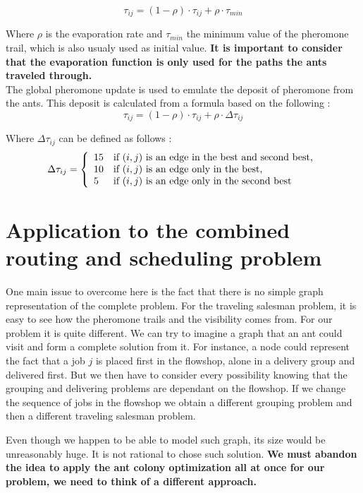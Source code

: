 \documentclass[UTF8, twoside]{EPURapport}
\begin{document}
\[
\tau_{ij} = (1-\rho) \cdot \tau_{ij}+\rho \cdot \tau_{min}
\]

	Where $\rho$ is the evaporation rate and $\tau_{min}$ the minimum value of the pheromone trail, which is also usualy used as initial value. \textbf{It is important to consider that the evaporation function is only used for the paths the ants traveled through.}
\\

	The global pheromone update is used to emulate the deposit of pheromone from the ants. This deposit is calculated from a formula based on the following :
	\\
	
\[
\tau_{ij} = (1-\rho) \cdot \tau_{ij}+\rho \cdot \Delta\tau_{ij}
\]

	Where $\Delta\tau_{ij}$ can be defined as follows :
	\\
	
\[
\Delta\tau_{ij} = \left\{ 
\begin{array}{l l}
15 & \text{if } (i,j) \text{ is an edge in the best and second best,}\\
10 & \text{if } (i,j) \text{ is an edge only in the best,}\\
5 & \text{if } (i,j) \text{ is an edge only in the second best}\\
\end{array}
\right.
\]

\section{Application to the combined routing and scheduling problem}

	\hspace{4ex}One main issue to overcome here is the fact that there is no simple graph representation of the complete problem. For the traveling salesman problem, it is easy to see how the pheromone trails and the visibility comes from. For our problem it is quite different. We can try to imagine a graph that an ant could visit and form a complete solution from it. For instance, a node could represent the fact that a job $j$ is placed first in the flowshop, alone in a delivery group and delivered first. But we then have to consider every possibility knowing that the grouping and delivering problems are dependant on the flowshop. If we change the sequence of jobs in the flowshop we obtain a different grouping problem and then a different traveling salesman problem.
	
	Even though we happen to be able to model such graph, its size would be unreasonably huge. It is not rational to chose such solution. \textbf{We must abandon the idea to apply the ant colony optimization all at once for our problem, we need to think of a different approach.}
	\\
	
\end{document}
